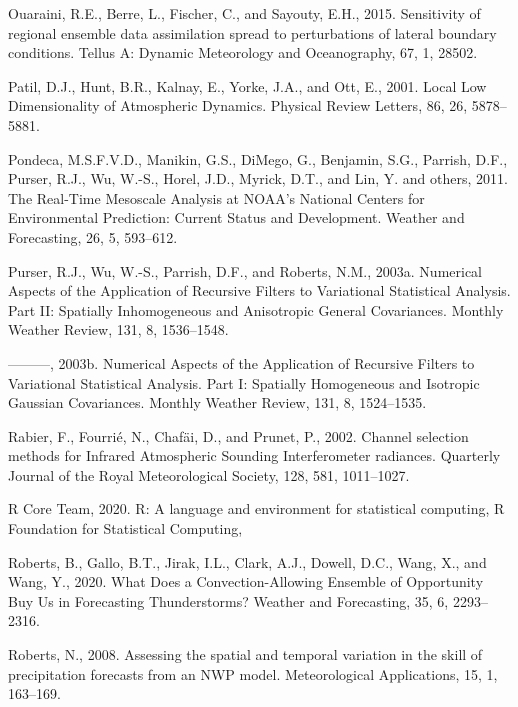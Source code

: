 \documentclass[12pt,oneside]{reedthesis}
\begin{document}
\leavevmode\hypertarget{ref-ouaraini2015}{}%
Ouaraini, R.E., Berre, L., Fischer, C., and Sayouty, E.H., 2015. Sensitivity of regional ensemble data assimilation spread to perturbations of lateral boundary conditions. Tellus A: Dynamic Meteorology and Oceanography, 67, 1, 28502.

\leavevmode\hypertarget{ref-patil2001}{}%
Patil, D.J., Hunt, B.R., Kalnay, E., Yorke, J.A., and Ott, E., 2001. Local Low Dimensionality of Atmospheric Dynamics. Physical Review Letters, 86, 26, 5878--5881.

\leavevmode\hypertarget{ref-pondeca2011}{}%
Pondeca, M.S.F.V.D., Manikin, G.S., DiMego, G., Benjamin, S.G., Parrish, D.F., Purser, R.J., Wu, W.-S., Horel, J.D., Myrick, D.T., and Lin, Y. and others, 2011. The Real-Time Mesoscale Analysis at NOAA's National Centers for Environmental Prediction: Current Status and Development. Weather and Forecasting, 26, 5, 593--612.

\leavevmode\hypertarget{ref-purser2003a}{}%
Purser, R.J., Wu, W.-S., Parrish, D.F., and Roberts, N.M., 2003a. Numerical Aspects of the Application of Recursive Filters to Variational Statistical Analysis. Part II: Spatially Inhomogeneous and Anisotropic General Covariances. Monthly Weather Review, 131, 8, 1536--1548.

\leavevmode\hypertarget{ref-purser2003}{}%
---------, 2003b. Numerical Aspects of the Application of Recursive Filters to Variational Statistical Analysis. Part I: Spatially Homogeneous and Isotropic Gaussian Covariances. Monthly Weather Review, 131, 8, 1524--1535.

\leavevmode\hypertarget{ref-rabier2002}{}%
Rabier, F., Fourrié, N., Chafäi, D., and Prunet, P., 2002. Channel selection methods for Infrared Atmospheric Sounding Interferometer radiances. Quarterly Journal of the Royal Meteorological Society, 128, 581, 1011--1027.

\leavevmode\hypertarget{ref-rcoreteam2020}{}%
R Core Team, 2020. R: A language and environment for statistical computing, R Foundation for Statistical Computing,

\leavevmode\hypertarget{ref-roberts2020}{}%
Roberts, B., Gallo, B.T., Jirak, I.L., Clark, A.J., Dowell, D.C., Wang, X., and Wang, Y., 2020. What Does a Convection-Allowing Ensemble of Opportunity Buy Us in Forecasting Thunderstorms? Weather and Forecasting, 35, 6, 2293--2316.

\leavevmode\hypertarget{ref-roberts2008}{}%
Roberts, N., 2008. Assessing the spatial and temporal variation in the skill of precipitation forecasts from an NWP model. Meteorological Applications, 15, 1, 163--169.
\end{document}
